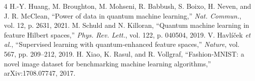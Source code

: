 \documentclass[conference]{IEEEtran}
\begin{document}
\begin{thebibliography}{4}
 H.-Y. Huang, M. Broughton, M. Mohseni, R. Babbush, S. Boixo, H. Neven, and J. R. McClean, ``Power of data in quantum machine learning,'' \textit{Nat. Commun.}, vol. 12, p. 2631, 2021.
 M. Schuld and N. Killoran, ``Quantum machine learning in feature Hilbert spaces,'' \textit{Phys. Rev. Lett.}, vol. 122, p. 040504, 2019.
 V. Havl\'{i}\v{c}ek \textit{et al.}, ``Supervised learning with quantum-enhanced feature spaces,'' \textit{Nature}, vol. 567, pp. 209--212, 2019.
 H. Xiao, K. Rasul, and R. Vollgraf, ``Fashion-MNIST: a novel image dataset for benchmarking machine learning algorithms,'' arXiv:1708.07747, 2017.
\end{thebibliography}
\end{document}
